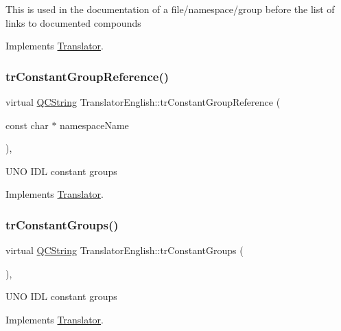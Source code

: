 This is used in the documentation of a file/namespace/group before the list of links to documented compounds 

Implements \mbox{\hyperlink{class_translator}{Translator}}.

\mbox{\label{class_translator_english_a69b97a9ad8ce2472c65afb89547a13e5}} 
\subsubsection{\texorpdfstring{trConstantGroupReference()}{trConstantGroupReference()}}
{\footnotesize\ttfamily virtual \mbox{\hyperlink{class_q_c_string}{Q\+C\+String}} Translator\+English\+::tr\+Constant\+Group\+Reference (\begin{DoxyParamCaption}\item[{const char $\ast$}]{namespace\+Name }\end{DoxyParamCaption})\hspace{0.3cm}{\ttfamily [inline]}, {\ttfamily [virtual]}}

U\+NO I\+DL constant groups 

Implements \mbox{\hyperlink{class_translator}{Translator}}.

\mbox{\label{class_translator_english_a035575d56336402ab3b2103747f4b429}} 
\subsubsection{\texorpdfstring{trConstantGroups()}{trConstantGroups()}}
{\footnotesize\ttfamily virtual \mbox{\hyperlink{class_q_c_string}{Q\+C\+String}} Translator\+English\+::tr\+Constant\+Groups (\begin{DoxyParamCaption}{ }\end{DoxyParamCaption})\hspace{0.3cm}{\ttfamily [inline]}, {\ttfamily [virtual]}}

U\+NO I\+DL constant groups 

Implements \mbox{\hyperlink{class_translator}{Translator}}.

